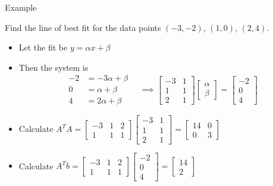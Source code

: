 \documentclass[10pt]{beamer}
\begin{document}
\begin{frame}{Example}
\begin{example}
    Find the line of best fit for the data points $(-3,-2)$, $(1,0)$, $(2,4)$. 
\end{example}
\begin{itemize}
    \item Let the fit be $y=\alpha x + \beta$ 

    \item Then the system is 
    $$
    \begin{aligned}
        -2 &= -3\alpha + \beta\\
        0 &= \alpha + \beta \\
        4 &= 2\alpha + \beta
    \end{aligned} \quad \implies \begin{bmatrix}
            -3 & 1\\
            1 & 1\\
            2 & 1
        \end{bmatrix} \begin{bmatrix}
            \alpha\\\beta
        \end{bmatrix}= \begin{bmatrix}
            -2\\0\\4
        \end{bmatrix}
    $$
    \item Calculate $A^TA =\begin{bmatrix}
            -3 & 1 & 2\\
            1 & 1 & 1
        \end{bmatrix} \begin{bmatrix}
            -3 & 1\\
            1 & 1\\
            2 & 1
        \end{bmatrix}  =\begin{bmatrix}
        14 & 0\\0 & 3
    \end{bmatrix}$ 
    
    \item Calculate $A^Tb=\begin{bmatrix}
            -3 & 1 & 2\\
            1 & 1 & 1
        \end{bmatrix}\begin{bmatrix}
            -2\\0\\4
        \end{bmatrix}=\begin{bmatrix}
        14\\2
    \end{bmatrix}$

\end{itemize}
\end{frame}
\end{document}
